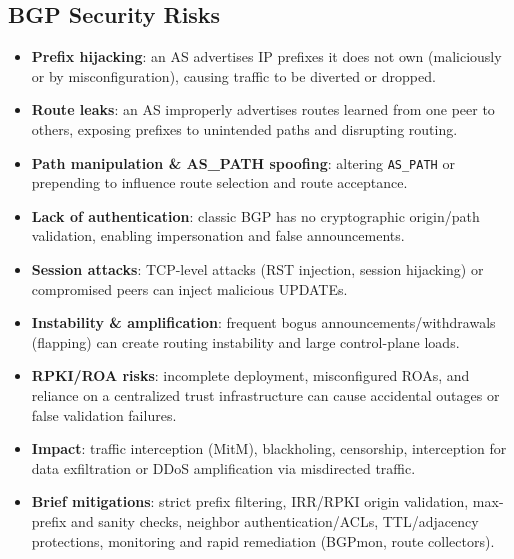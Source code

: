 \documentclass[11pt]{article}
\begin{document}
\subsection{BGP Security Risks}
\begin{itemize}
  \item \textbf{Prefix hijacking}: an AS advertises IP prefixes it does not own (maliciously or by misconfiguration), causing traffic to be diverted or dropped.
  
  \item \textbf{Route leaks}: an AS improperly advertises routes learned from one peer to others, exposing prefixes to unintended paths and disrupting routing.
  
  \item \textbf{Path manipulation \& AS\_PATH spoofing}: altering \texttt{AS\_PATH} or prepending to influence route selection and route acceptance.
  
  \item \textbf{Lack of authentication}: classic BGP has no cryptographic origin/path validation, enabling impersonation and false announcements.
  
  \item \textbf{Session attacks}: TCP-level attacks (RST injection, session hijacking) or compromised peers can inject malicious UPDATEs.
  
  \item \textbf{Instability \& amplification}: frequent bogus announcements/withdrawals (flapping) can create routing instability and large control-plane loads.
  
  \item \textbf{RPKI/ROA risks}: incomplete deployment, misconfigured ROAs, and reliance on a centralized trust infrastructure can cause accidental outages or false validation failures.
  
  \item \textbf{Impact}: traffic interception (MitM), blackholing, censorship, interception for data exfiltration or DDoS amplification via misdirected traffic.
  
  \item \textbf{Brief mitigations}: strict prefix filtering, IRR/RPKI origin validation, max-prefix and sanity checks, neighbor authentication/ACLs, TTL/adjacency protections, monitoring and rapid remediation (BGPmon, route collectors).
\end{itemize}

\end{document}
